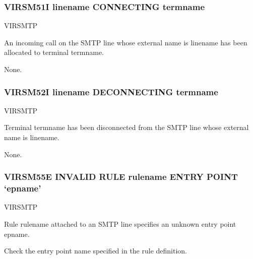 \documentclass[letterpaper,10pt,english]{sphinxmanual}
\begin{document}
\subsubsection{VIRSM51I linename CONNECTING termname}
\label{\detokenize{messages:virsm51i-linename-connecting-termname}}\begin{description}
\sphinxAtStartPar
VIRSMTP

\sphinxAtStartPar
An incoming call on the SMTP line whose external name is linename has been allocated to terminal termname.

\sphinxAtStartPar
None.

\end{description}


\subsubsection{VIRSM52I linename DECONNECTING termname}
\label{\detokenize{messages:virsm52i-linename-deconnecting-termname}}\begin{description}
\sphinxAtStartPar
VIRSMTP

\sphinxAtStartPar
Terminal termname has been disconnected from the SMTP line whose external name is linename.

\sphinxAtStartPar
None.

\end{description}


\subsubsection{VIRSM55E INVALID RULE rulename ENTRY POINT ‘epname’}
\label{\detokenize{messages:virsm55e-invalid-rule-rulename-entry-point-epname}}\begin{description}
\sphinxAtStartPar
VIRSMTP

\sphinxAtStartPar
Rule rulename attached to an SMTP line specifies an unknown entry point epname.

\sphinxAtStartPar
Check the entry point name specified in the rule definition.

\end{description}
\end{document}
